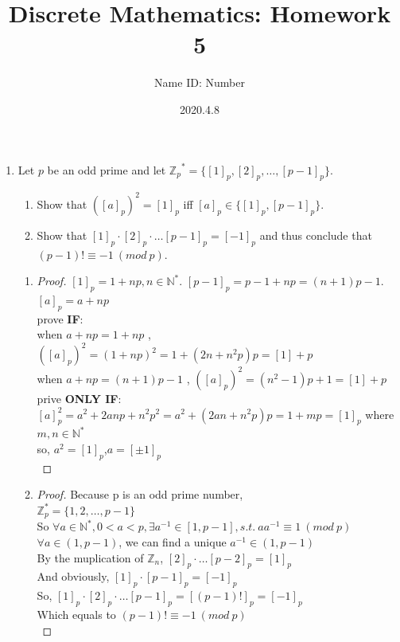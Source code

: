 \documentclass{article}
\title{Discrete Mathematics:  Homework 5}
\author{Name  \quad  \quad ID: Number}
\date{2020.4.8}
\theoremstyle{break}
\begin{document}
\maketitle
\begin{enumerate}
\item Let $p$ be an odd prime and let ${\mathbb{{Z}}_p}^* = \{  [1]_p, [2]_p, \dots , [p-1]_p \}.$
\begin{enumerate}
        \item Show that $([a]_p)^2 = [1]_p$ iff $[a]_p \in \{[1]_p, [p-1]_p\}$.
        \item Show that $[1]_p \cdot [2]_p \cdot \dots [p-1]_p = [-1]_p $ and thus conclude that $(p-1)! \equiv -1 \ (mod \ p) $.
\end{enumerate}
\begin{enumerate}
\item 
\begin{proof}
$[1]_p = 1+np , n \in \mathbb{N}^*.$   $[p-1]_p = p-1+np = (n+1)p -1 .$ $[a]_p = a+np$\\
prove \textbf{IF}:\\
when $a+np=1+np$ , $([a]_p)^2 = (1+np)^2 = 1 + (2n + n^2p)p = [1]+p$\\
when $a+np = (n+1)p -1$ , $([a]_p)^2 = (n^2-1)p+1 = [1]+p$  \\
prive \textbf{ONLY IF}:\\
$[a]_p^2 = a^2 + 2anp + n^2p^2 = a^2 + (2an + n^2p)p = 1 + mp = [1]_p$ where $m,n \in \mathbb{N}^*$\\
so, $a^2 = [1]_p$,$a = [\pm 1]_p$\\
\end{proof}
\item 
\begin{proof}
Because p is an odd prime number, \\
$\mathbb{Z}_p^* = \{1,2, \dots, p-1\}$\\
So $\forall a \in \mathbb{N}^* , 0 < a < p, \exists a^{-1} \in [1,p-1], s.t. \ a a^{-1} \equiv 1 \ (mod \ p)$\\
$\forall a \in (1,p-1)$, we can find a unique $a^{-1} \in (1,p-1)$ \\
By the muplication of $\mathbb{Z}_n$, $[2]_p \cdot \dots [p-2]_p = [1]_p $ \\
And obviously, $[1]_p \cdot [p-1]_p  = [-1]_p$\\
So, $[1]_p \cdot [2]_p \cdot \dots [p-1]_p = [(p-1)!]_p= [-1]_p $  \\
Which equals to $(p-1)! \equiv -1 \ (mod \ p) $\\
\end{proof}

\end{enumerate}
\end{enumerate}
\end{document}
